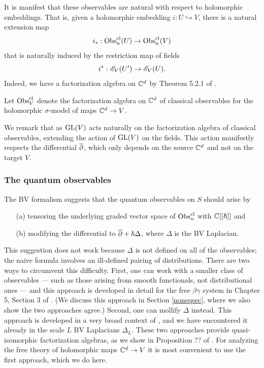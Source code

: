 \documentclass[10pt]{amsart}
\begin{document}
It is manifest that these observables are natural with respect to holomorphic embeddings.
That is, given a holomorphic embedding $i: U \hookrightarrow V$,
there is a natural extension map
\[
i_*: {\rm Obs}^{\rm cl}_n(U) \to {\rm Obs}^{\rm cl}_n(V)
\]
that is naturally induced by the restriction map of fields
\[
i^*: \mathscr E_V(U') \to \mathscr E_V(U).
\]
Indeed, we have a factorization algebra on $\mathbb C^d$ by Theorem 5.2.1 of \cite{CG1}.

\begin{dfn}
Let ${\rm Obs}^{\rm cl}_V$ denote the factorization algebra on $\mathbb C^d$ of classical observables for the holomorphic $\sigma$-model of maps $\mathbb C^d \to V$.
\end{dfn}

We remark that as ${\rm GL}(V)$ acts naturally on the factorization algebra of classical observables, extending the action of ${\rm GL}(V)$ on the fields.
This action manifestly respects the differential $\overline{\partial}$, which only depends on the source $\mathbb C^d$ and not on the target $V$. 

\subsubsection{The quantum observables}

The BV formalism suggests that the quantum observables on $S$ should arise by 
\begin{enumerate}
\item[(a)] tensoring the underlying graded vector space of ${\rm Obs}^{\rm cl}_n$ with $\mathbb C[[\hbar]]$ and
\item[(b)] modifying the differential to $\overline{\partial} +\hbar \Delta$, where $\Delta$ is the BV Laplacian.
\end{enumerate}
This suggestion does not work because $\Delta$ is not defined on all of the observables;
the naive formula involves an ill-defined pairing of distributions.
There are two ways to circumvent this difficulty. 
First, one can work with a smaller class of observables --- such as those arising from smooth functionals, not distributional ones --- and this approach is developed in detail for the free $\beta\gamma$ system in Chapter 5, Section 3 of \cite{CG1}.
(We discuss this approach in Section \ref{noneqsec}, where we also show the two approaches agree.) 
Second, one can mollify $\Delta$ instead.
This approach is developed in a very broad context of \cite{CG2}, and we have encountered it already in the scale $L$ BV Laplacians $\Delta_L$.
These two approaches provide quasi-isomorphic factorization algebras, 
as we show in Proposition ?? of \cite{GGW}. 
For analyzing the free theory of holomorphic maps $\mathbb C^d \to V$ it is most convenient to use the first approach, which we do here.
\end{document}
